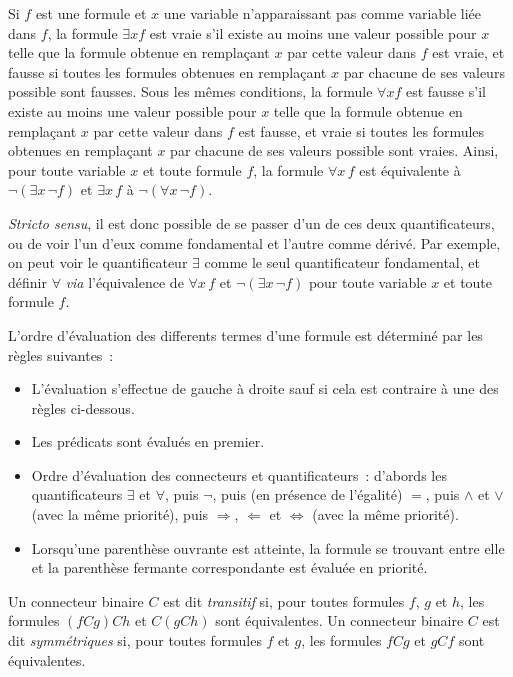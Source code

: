 Si $f$ est une formule et $x$ une variable n'apparaissant pas comme variable liée dans $f$, la formule $\exists x f$ est vraie s'il existe au moins une valeur possible pour $x$ telle que la formule obtenue en remplaçant $x$ par cette valeur dans $f$ est vraie, et fausse si toutes les formules obtenues en remplaçant $x$ par chacune de ses valeurs possible sont fausses. 
Sous les mêmes conditions, la formule $\forall x f$ est fausse s'il existe au moins une valeur possible pour $x$ telle que la formule obtenue en remplaçant $x$ par cette valeur dans $f$ est fausse, et vraie si toutes les formules obtenues en remplaçant $x$ par chacune de ses valeurs possible sont vraies. 
Ainsi, pour toute variable $x$ et toute formule $f$, la formule $\forall x \, f$ est équivalente à $\neg (\exists x \, \neg f)$ et $\exists x \, f$ à $\neg (\forall x \, \neg f)$. 

\textit{Stricto sensu}, il est donc possible de se passer d'un de ces deux quantificateurs, ou de voir l'un d'eux comme fondamental et l'autre comme dérivé. 
Par exemple, on peut voir le quantificateur $\exists$ comme le seul quantificateur fondamental, et définir $\forall$ \textit{via} l'équivalence de $\forall x \, f$ et $\neg \left( \exists x \, \neg f \right)$ pour toute variable $x$ et toute formule $f$. 

L'ordre d'évaluation des differents termes d'une formule est déterminé par les règles suivantes : 
\begin{itemize}
    \item L'évaluation s'effectue de gauche à droite sauf si cela est contraire à une des règles ci-dessous.
    \item Les prédicats sont évalués en premier.
    \item Ordre d'évaluation des connecteurs et quantificateurs : d'abords les quantificateurs $\exists$ et $\forall$, puis $\neg$, puis (en présence de l'égalité) $=$, puis $\wedge$ et $\vee$ (avec la même priorité), puis $\Rightarrow$, $\Leftarrow$ et $\Leftrightarrow$ (avec la même priorité).
    \item Lorsqu'une parenthèse ouvrante est atteinte, la formule se trouvant entre elle et la parenthèse fermante correspondante est évaluée en priorité.
\end{itemize}

Un connecteur binaire $C$ est dit \textit{transitif} si, pour toutes formules $f$, $g$ et $h$, les formules $(f C g) C h$ et $C (g C h)$ sont équivalentes.
Un connecteur binaire $C$ est dit \textit{symmétriques} si, pour toutes formules $f$ et $g$, les formules $f C g$ et $g C f$ sont équivalentes.

